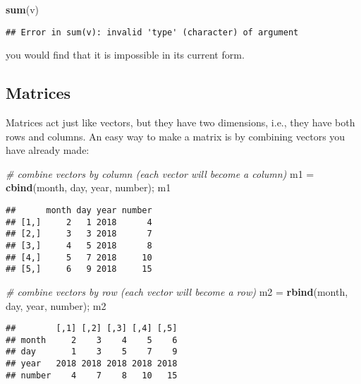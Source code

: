 \documentclass[]{book}
\newenvironment{Shaded}{\begin{snugshade}}{\end{snugshade}}
\newcommand{\CommentTok}[1]{\textcolor[rgb]{0.56,0.35,0.01}{\textit{#1}}}
\newcommand{\KeywordTok}[1]{\textcolor[rgb]{0.13,0.29,0.53}{\textbf{#1}}}
\newcommand{\NormalTok}[1]{#1}
\newcommand{\StringTok}[1]{\textcolor[rgb]{0.31,0.60,0.02}{#1}}
\begin{document}
\begin{Shaded}
\begin{Highlighting}[]
\KeywordTok{sum}\NormalTok{(v)}
\end{Highlighting}
\end{Shaded}

\begin{verbatim}
## Error in sum(v): invalid 'type' (character) of argument
\end{verbatim}

you would find that it is impossible in its current form.

\hypertarget{matrices}{%
\subsection{Matrices}\label{matrices}}

Matrices act just like vectors, but they have two dimensions, i.e., they have both rows and columns. An easy way to make a matrix is by combining vectors you have already made:

\begin{Shaded}
\begin{Highlighting}[]
\CommentTok{# combine vectors by column (each vector will become a column)}
\NormalTok{m1 =}\StringTok{ }\KeywordTok{cbind}\NormalTok{(month, day, year, number); m1}
\end{Highlighting}
\end{Shaded}

\begin{verbatim}
##      month day year number
## [1,]     2   1 2018      4
## [2,]     3   3 2018      7
## [3,]     4   5 2018      8
## [4,]     5   7 2018     10
## [5,]     6   9 2018     15
\end{verbatim}

\begin{Shaded}
\begin{Highlighting}[]
\CommentTok{# combine vectors by row (each vector will become a row)}
\NormalTok{m2 =}\StringTok{ }\KeywordTok{rbind}\NormalTok{(month, day, year, number); m2}
\end{Highlighting}
\end{Shaded}

\begin{verbatim}
##        [,1] [,2] [,3] [,4] [,5]
## month     2    3    4    5    6
## day       1    3    5    7    9
## year   2018 2018 2018 2018 2018
## number    4    7    8   10   15
\end{verbatim}
\end{document}

